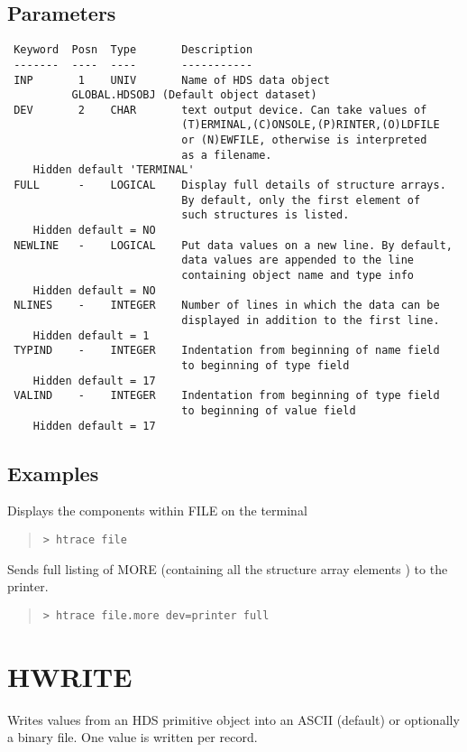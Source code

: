 \documentclass{book}
\renewcommand{\_}{{\tt\char'137}}     %
\begin{document}
\subsection{Parameters}
\begin{verbatim}
 Keyword  Posn  Type       Description
 -------  ----  ----       -----------
 INP       1    UNIV       Name of HDS data object
          GLOBAL.HDSOBJ (Default object dataset)
 DEV       2    CHAR       text output device. Can take values of
                           (T)ERMINAL,(C)ONSOLE,(P)RINTER,(O)LDFILE
                           or (N)EWFILE, otherwise is interpreted
                           as a filename.
    Hidden default 'TERMINAL'
 FULL      -    LOGICAL    Display full details of structure arrays.
                           By default, only the first element of
                           such structures is listed.
    Hidden default = NO
 NEWLINE   -    LOGICAL    Put data values on a new line. By default,
                           data values are appended to the line
                           containing object name and type info
    Hidden default = NO
 NLINES    -    INTEGER    Number of lines in which the data can be
                           displayed in addition to the first line.
    Hidden default = 1
 TYPIND    -    INTEGER    Indentation from beginning of name field
                           to beginning of type field
    Hidden default = 17
 VALIND    -    INTEGER    Indentation from beginning of type field
                           to beginning of value field
    Hidden default = 17

\end{verbatim}\subsection{Examples}
Displays the components within FILE on the terminal
\begin{quote}\begin{verbatim}
> htrace file
\end{verbatim}\end{quote}
Sends full listing of MORE (containing all the
structure array elements ) to the printer.
\begin{quote}\begin{verbatim}
> htrace file.more dev=printer full
\end{verbatim}\end{quote}
\section{HWRITE}
Writes values from an HDS primitive object into an ASCII
(default) or optionally a binary file. One value is written per
record.
\end{document}
